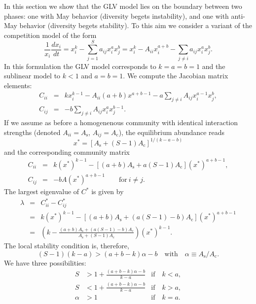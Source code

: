 \documentclass[12pt]{article}
\begin{document}
In this section we show that the GLV model lies on the boundary between two phases: one with May behavior (diversity begets instability), and one with anti-May behavior (diversity begets stability). To this aim we consider a variant of the competition model of the form
\begin{equation}
    \frac{1}{x_i}\frac{dx_i}{dt} = x_i^k - \sum_{j = 1}^Sa_{ij}x_i^a x_j^b = x_i^k - A_{ii} x_i^{a+b}- \sum_{j \neq i}a_{ij}x_i^a x_j^b.
\end{equation}
In this formulation the GLV model corresponds to $k = a = b = 1$ and the sublinear model to $k < 1$ and $a = b = 1$. We compute the Jacobian matrix elements:
\begin{eqnarray}
    C_{ii} &=& kx_i^{k-1} - A_{ii} (a+b) x^{a+b-1} - a\sum_{j \neq i}A_{ij}x_i^{a-1} x_j^b, \\  
    C_{ij} &=& -b\sum_{j \neq i}A_{ij}x_i^{a} x_j^{b-1}.
\end{eqnarray}
If we assume as before a homogenenous community with identical interaction strengths (denoted $A_{ii} = A_{\textrm{s}}$, $A_{ij} = A_{\textrm{c}}$), the equilibrium abundance reads
\begin{equation}
    x^* = [A_{\textrm{s}} + (S-1)A_{\textrm{c}}]^{1/(k-a-b)} 
\end{equation}
and the corresponding community matrix
\begin{eqnarray}
    C_{ii} &=& k(x^*)^{k-1} - [(a+b) A_{\textrm{s}} + a(S-1)A_{\textrm{c}}](x^*)^{a+b-1}, \nonumber \\  
    C_{ij} &=& -bA(x^*)^{a+b-1} \quad\quad \textrm{for}\ i \neq j.\nonumber
\end{eqnarray}
The largest eigenvalue of $C^*$ is given by
\begin{eqnarray}
    \lambda &=& C^*_{ii} - C^*_{ij}\nonumber\\
     &=& k(x^*)^{k-1} - [(a+b)A_{\textrm{s}} +(a(S-1)-b)A_{\textrm{c}}](x^*)^{a+b-1}\nonumber\\
    & = & \left(k - \frac{(a+b)A_{\textrm{s}} +(a(S-1)-b)A_{\textrm{c}}}{A_{\textrm{s}} + (S-1)A_{\textrm{c}}}\right)(x^*)^{k-1}.\nonumber
\end{eqnarray}
The local stability condition is, therefore, 
\begin{equation}
    (S-1)(k-a) > (a+b - k)\alpha - b \quad \textrm{with}\quad \alpha \equiv A_{\textrm{s}}/A_{\textrm{c}}. 
\end{equation}
We have three possibilities:
\begin{align}
    S &> 1 + \frac{(a+b - k)\alpha - b}{k-a} &\textrm{if}\quad k < a,\nonumber\\
    S &< 1 + \frac{(a+b - k)\alpha - b}{k-a} &\textrm{if}\quad k > a,\nonumber\\
    \alpha &> 1 &\textrm{if}\quad k = a.\nonumber
\end{align}
\end{document}
